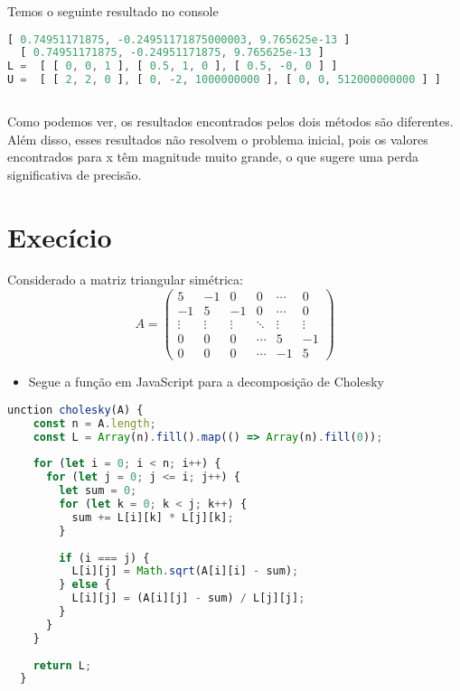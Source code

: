 \documentclass{article}
\begin{document}
 Temos o seguinte resultado no console 
 \begin{lstlisting}[language=JavaScript, caption={Resoltado}]
  [ 0.74951171875, -0.24951171875000003, 9.765625e-13 ]
  [ 0.74951171875, -0.24951171875, 9.765625e-13 ]
L =  [ [ 0, 0, 1 ], [ 0.5, 1, 0 ], [ 0.5, -0, 0 ] ]
U =  [ [ 2, 2, 0 ], [ 0, -2, 1000000000 ], [ 0, 0, 512000000000 ] ]
  
 \end{lstlisting}
 \bigskip
 Como podemos ver, os resultados encontrados pelos dois métodos são diferentes. Além disso, esses resultados não resolvem o problema inicial, pois os valores encontrados para x têm magnitude muito grande, o que sugere uma perda significativa de precisão.

\section{Execício}
Considerado a matriz triangular simétrica:
\begin{equation*}
  A=\begin{pmatrix}
    5&-1&0&0&\cdots &0\\
    -1&5&-1&0&\cdots &0\\
    \vdots &\vdots &\vdots &\ddots&\vdots&\vdots\\
    0&0&0&\cdots&5&-1\\
    0&0&0&\cdots&-1&5
  \end{pmatrix}
\end{equation*}
\begin{itemize}
  \item Segue a função em JavaScript para a decomposição de Cholesky 
\end{itemize}
\begin{lstlisting}[language=JavaScript, caption={Deconposição de Cholesky}]
  unction cholesky(A) {
    const n = A.length;
    const L = Array(n).fill().map(() => Array(n).fill(0));
  
    for (let i = 0; i < n; i++) {
      for (let j = 0; j <= i; j++) {
        let sum = 0;
        for (let k = 0; k < j; k++) {
          sum += L[i][k] * L[j][k];
        }
  
        if (i === j) {
          L[i][j] = Math.sqrt(A[i][i] - sum);
        } else {
          L[i][j] = (A[i][j] - sum) / L[j][j];
        }
      }
    }
  
    return L;
  }
\end{lstlisting}
\end{document}
